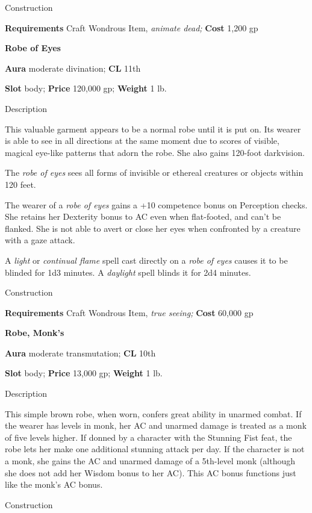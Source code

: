 Construction
				
\textbf{Requirements} Craft Wondrous Item, \textit{animate dead;}\textbf{ Cost }1,200 gp
				
\textbf{Robe of Eyes}
				
\textbf{Aura} moderate divination;\textbf{ CL }11th
				
\textbf{Slot} body; \textbf{Price} 120,000 gp; \textbf{Weight} 1 lb.
				
Description
				
This valuable garment appears to be a normal robe until it is put on. Its wearer is able to see in all directions at the same moment due to scores of visible, magical eye-like patterns that adorn the robe. She also gains 120-foot darkvision.
				
The \textit{robe of eyes} sees all forms of invisible or ethereal creatures or objects within 120 feet.
				
The wearer of a \textit{robe of eyes} gains a +10 competence bonus on Perception checks. She retains her Dexterity bonus to AC even when flat-footed, and can't be flanked. She is not able to avert or close her eyes when confronted by a creature with a gaze attack.
				
A \textit{light} or \textit{continual flame} spell cast directly on a \textit{robe of eyes} causes it to be blinded for 1d3 minutes. A \textit{daylight} spell blinds it for 2d4 minutes. 
				
Construction
				
\textbf{Requirements} Craft Wondrous Item,\textit{ true seeing;}\textbf{ Cost }60,000 gp
				
\textbf{Robe, Monk's}
				
\textbf{Aura} moderate transmutation; \textbf{CL} 10th
				
\textbf{Slot }body; \textbf{Price} 13,000 gp; \textbf{Weight} 1 lb.
				
Description
				
This simple brown robe, when worn, confers great ability in unarmed combat. If the wearer has levels in monk, her AC and unarmed damage is treated as a monk of five levels higher. If donned by a character with the Stunning Fist feat, the robe lets her make one additional stunning attack per day. If the character is not a monk, she gains the AC and unarmed damage of a 5th-level monk (although she does not add her Wisdom bonus to her AC). This AC bonus functions just like the monk's AC bonus.
				
Construction
				
